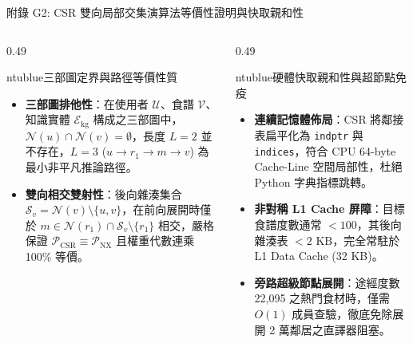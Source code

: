 \documentclass[aspectratio=169, 10pt]{beamer}
\begin{document}
\begin{frame}{附錄 G2: CSR 雙向局部交集演算法等價性證明與快取親和性}
  \begin{columns}[t]
    \begin{column}{0.49\textwidth}
      \begin{mybox}{ntublue}{三部圖定界與路徑等價性質}
        \footnotesize
        \begin{itemize}
          \item \textbf{三部圖排他性}：在使用者 $\mathcal{U}$、食譜 $\mathcal{V}$、知識實體 $\mathcal{E}_{\text{kg}}$ 構成之三部圖中，$\mathcal{N}(u) \cap \mathcal{N}(v) = \emptyset$，長度 $L=2$ 並不存在，$L=3$ ($u \to r_1 \to m \to v$) 為最小非平凡推論路徑。
          \item \textbf{雙向相交雙射性}：後向雜湊集合 $\mathcal{S}_v = \mathcal{N}(v) \setminus \{u, v\}$，在前向展開時僅於 $m \in \mathcal{N}(r_1) \cap \mathcal{S}_v \setminus \{r_1\}$ 相交，嚴格保證 $\mathcal{P}_{\text{CSR}} \equiv \mathcal{P}_{\text{NX}}$ 且權重代數連乘 100\% 等價。
        \end{itemize}
      \end{mybox}
    \end{column}

    \begin{column}{0.49\textwidth}
      \begin{mybox}{ntublue}{硬體快取親和性與超節點免疫}
        \footnotesize
        \begin{itemize}
          \item \textbf{連續記憶體佈局}：CSR 將鄰接表扁平化為 \texttt{indptr} 與 \texttt{indices}，符合 CPU 64-byte Cache-Line 空間局部性，杜絕 Python 字典指標跳轉。
          \item \textbf{非對稱 L1 Cache 屏障}：目標食譜度數通常 $<100$，其後向雜湊表 $<2\text{ KB}$，完全常駐於 L1 Data Cache (32 KB)。
          \item \textbf{旁路超級節點展開}：途經度數 22,095 之熱門食材時，僅需 $O(1)$ 成員查驗，徹底免除展開 2 萬鄰居之直譯器阻塞。
        \end{itemize}
      \end{mybox}
    \end{column}
  \end{columns}
\end{frame}
\end{document}

